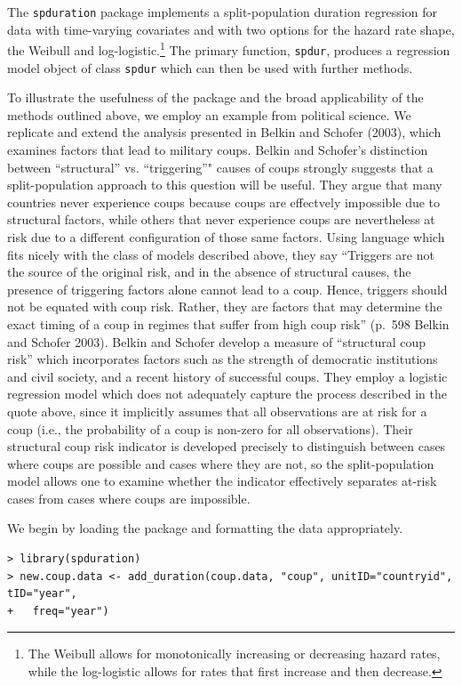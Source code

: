 \documentclass[article]{jss}
\begin{document}
The \texttt{spduration} package implements a split-population duration
regression for data with time-varying covariates and with two options
for the hazard rate shape, the Weibull and
log-logistic.\footnote{The Weibull allows for monotonically increasing or decreasing hazard rates, while the log-logistic allows for rates that first increase and then decrease.}
The primary function, \texttt{spdur}, produces a regression model object
of class \texttt{spdur} which can then be used with further methods.

To illustrate the usefulness of the package and the broad applicability
of the methods outlined above, we employ an example from political
science. We replicate and extend the analysis presented in Belkin and
Schofer (2003), which examines factors that lead to military coups.
Belkin and Schofer's distinction between ``structural'' vs.
``triggering''" causes of coups strongly suggests that a
split-population approach to this question will be useful. They argue
that many countries never experience coups because coups are effectvely
impossible due to structural factors, while others that never experience
coups are nevertheless at risk due to a different configuration of those
same factors. Using language which fits nicely with the class of models
described above, they say ``Triggers are not the source of the original
risk, and in the absence of structural causes, the presence of
triggering factors alone cannot lead to a coup. Hence, triggers should
not be equated with coup risk. Rather, they are factors that may
determine the exact timing of a coup in regimes that suffer from high
coup risk'' (p.~598 Belkin and Schofer 2003). Belkin and Schofer develop
a measure of ``structural coup risk'' which incorporates factors such as
the strength of democratic institutions and civil society, and a recent
history of successful coups. They employ a logistic regression model
which does not adequately capture the process described in the quote
above, since it implicitly assumes that all observations are at risk for
a coup (i.e., the probability of a coup is non-zero for all
observations). Their structural coup risk indicator is developed
precisely to distinguish between cases where coups are possible and
cases where they are not, so the split-population model allows one to
examine whether the indicator effectively separates at-risk cases from
cases where coups are impossible.

We begin by loading the package and formatting the data appropriately.
\small

\begin{verbatim}
> library(spduration)
> new.coup.data <- add_duration(coup.data, "coup", unitID="countryid", tID="year", 
+   freq="year")
\end{verbatim}
\end{document}
